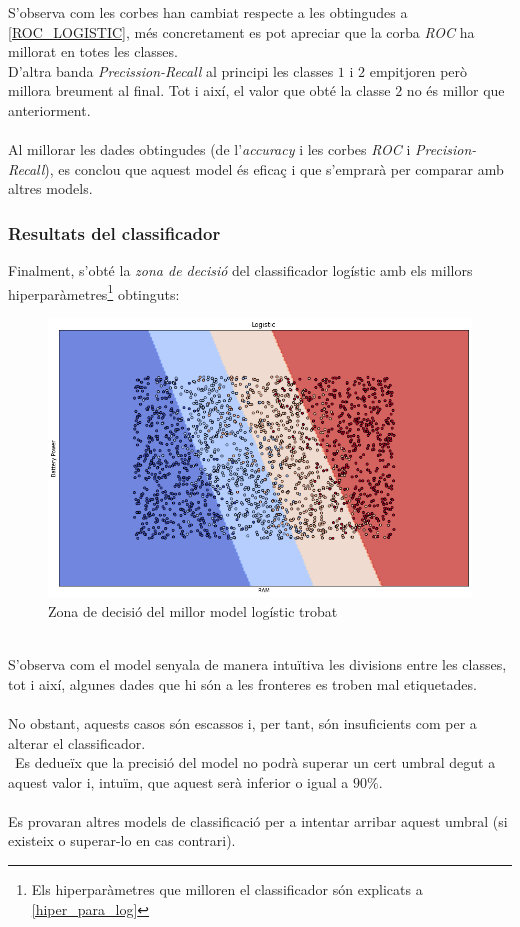 \documentclass[a4paper, 11pt]{article}
\begin{document}
S'observa com les corbes han cambiat respecte a les obtingudes a \textcolor{blue}{\ref{ROC_LOGISTIC}}, més concretament es pot apreciar que la corba \textit{ROC} ha millorat en totes les classes.\\
D'altra banda \textit{Precission-Recall} al principi les classes $1$ i $2$ empitjoren però millora breument al final. Tot i així, el valor que obté la classe $2$ no és millor que anteriorment.\\\\
Al millorar les dades obtingudes (de l'\textit{accuracy} i les corbes \textit{ROC} i \textit{Precision-Recall}), es conclou que aquest model és eficaç i que s'emprarà per comparar amb altres models.
\newpage
\subsubsection{Resultats del classificador}\label{zona_logistic}
Finalment, s'obté la \textit{zona de decisió} del classificador logístic amb els millors hiperparàmetres\footnote{Els hiperparàmetres que milloren el classificador són explicats a \textcolor{blue}{\ref{hiper_para_log}}} obtinguts:\\
\begin{figure}[h]
    \centering
    \includegraphics[width = 1\textwidth]{ZonasModelos/zona_logistic.png}
    \caption{Zona de decisió del millor model logístic trobat}
    \label{fig:my_label}
\end{figure}\\
S'observa com el model senyala de manera intuïtiva les divisions entre les classes, tot i així, algunes dades que hi són a les fronteres es troben mal etiquetades.\\\\
No obstant, aquests casos són escassos i, per tant, són insuficients com per a alterar el classificador.\\\
Es dedueïx que la precisió del model no podrà superar un cert umbral degut a aquest valor i, intuïm, que aquest serà inferior o igual a $90\%$. \\\\
Es provaran altres models de classificació per a intentar arribar aquest umbral (si existeix o superar-lo en cas contrari).
\newpage
\end{document}
